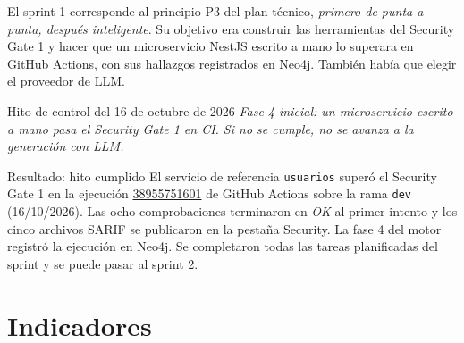 \documentclass[11pt,a4paper]{report}
\begin{document}
El sprint 1 corresponde al principio P3 del plan técnico, \emph{primero de punta a punta,
después inteligente}. Su objetivo era construir las herramientas del Security Gate 1 y hacer
que un microservicio NestJS escrito a mano lo superara en GitHub Actions, con sus hallazgos
registrados en Neo4j. También había que elegir el proveedor de LLM.

\begin{cajaazul}{Hito de control del 16 de octubre de 2026}
\emph{Fase 4 inicial: un microservicio escrito a mano pasa el Security Gate 1 en CI. Si no se
cumple, no se avanza a la generación con LLM.}
\end{cajaazul}

\begin{cajaverde}{Resultado: hito cumplido}
El servicio de referencia \texttt{usuarios} superó el Security Gate 1 en la ejecución
\href{https://github.com/PracticasESPE/Framework_Desarrollo_Seguro/actions/runs/38955751601}{38955751601}
de GitHub Actions sobre la rama \texttt{dev} (16/10/2026). Las ocho comprobaciones terminaron en
\emph{OK} al primer intento y los cinco archivos SARIF se publicaron en la pestaña Security. La
fase 4 del motor registró la ejecución en Neo4j. Se completaron todas las tareas planificadas
del sprint y se puede pasar al sprint 2.
\end{cajaverde}

\section{Indicadores}
\end{document}
